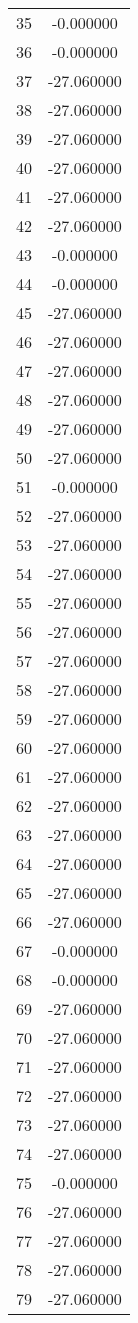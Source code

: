 \documentclass[12pt]{article}
\begin{document}
\begin{longtable}{@{}cc@{}}
35 & -0.000000 \\
36 & -0.000000 \\
37 & -27.060000 \\
38 & -27.060000 \\
39 & -27.060000 \\
40 & -27.060000 \\
41 & -27.060000 \\
42 & -27.060000 \\
43 & -0.000000 \\
44 & -0.000000 \\
45 & -27.060000 \\
46 & -27.060000 \\
47 & -27.060000 \\
48 & -27.060000 \\
49 & -27.060000 \\
50 & -27.060000 \\
51 & -0.000000 \\
52 & -27.060000 \\
53 & -27.060000 \\
54 & -27.060000 \\
55 & -27.060000 \\
56 & -27.060000 \\
57 & -27.060000 \\
58 & -27.060000 \\
59 & -27.060000 \\
60 & -27.060000 \\
61 & -27.060000 \\
62 & -27.060000 \\
63 & -27.060000 \\
64 & -27.060000 \\
65 & -27.060000 \\
66 & -27.060000 \\
67 & -0.000000 \\
68 & -0.000000 \\
69 & -27.060000 \\
70 & -27.060000 \\
71 & -27.060000 \\
72 & -27.060000 \\
73 & -27.060000 \\
74 & -27.060000 \\
75 & -0.000000 \\
76 & -27.060000 \\
77 & -27.060000 \\
78 & -27.060000 \\
79 & -27.060000 \\

\end{longtable}
\end{document}
